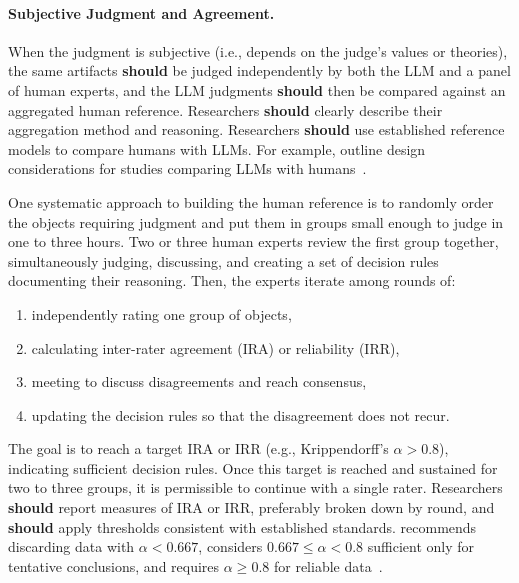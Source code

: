 \documentclass[smallextended]{svjour3}
\newcommand{\should}{\textbf{should}\xspace}
\newcommand{\guidelineparagraph}[1]{\paragraph{#1.}}
\newcommand{\guidelineparagraph}[1]{\paragraph{#1}}
\begin{document}
\guidelineparagraph{Subjective Judgment and Agreement}
When the judgment is subjective (i.e., depends on the judge's values or theories), the same artifacts \should be judged independently by both the LLM and a panel of human experts, and the LLM judgments \should then be compared against an aggregated human reference. Researchers \should clearly describe their aggregation method and reasoning.
Researchers \should use established reference models to compare humans with LLMs.
For example, \citeauthor{DBLP:conf/icse/SchneiderFW25} outline design considerations for studies comparing LLMs with humans~\cite{DBLP:conf/icse/SchneiderFW25}.

One systematic approach to building the human reference is to randomly order the objects requiring judgment and put them in groups small enough to judge in one to three hours. Two or three human experts review the first group together, simultaneously judging, discussing, and creating a set of decision rules documenting their reasoning. Then, the experts iterate among rounds of:
\begin{enumerate}
    \item independently rating one group of objects,
    \item calculating inter-rater agreement (IRA) or reliability (IRR),
    \item meeting to discuss disagreements and reach consensus,
    \item updating the decision rules so that the disagreement does not recur.
\end{enumerate}

The goal is to reach a target IRA or IRR (e.g., Krippendorff's $\alpha>0.8$), indicating sufficient decision rules. Once this target is reached and sustained for two to three groups, it is permissible to continue with a single rater.
Researchers \should report measures of IRA or IRR, preferably broken down by round, and \should apply thresholds consistent with established standards. \citeauthor{Krippendorff2018} recommends discarding data with $\alpha<0.667$, considers $0.667 \leq \alpha < 0.8$ sufficient only for tentative conclusions, and requires $\alpha \geq 0.8$ for reliable data~\cite{Krippendorff2018}.
\end{document}
